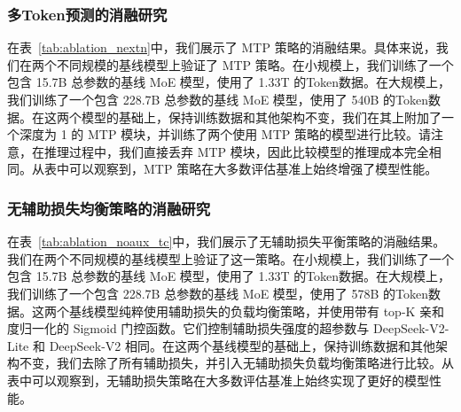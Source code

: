 \documentclass[lang=cn,a4paper,newtx]{elegantpaper}
\newcommand{\dsvii}{DeepSeek-V2}
\begin{document}
\subsubsection{多Token预测的消融研究}
\label{discussion:ablation_nextn}

在表~\ref{tab:ablation_nextn}中，我们展示了 MTP 策略的消融结果。具体来说，我们在两个不同规模的基线模型上验证了 MTP 策略。在小规模上，我们训练了一个包含 15.7B 总参数的基线 MoE 模型，使用了 1.33T 的Token数据。在大规模上，我们训练了一个包含 228.7B 总参数的基线 MoE 模型，使用了 540B 的Token数据。在这两个模型的基础上，保持训练数据和其他架构不变，我们在其上附加了一个深度为 1 的 MTP 模块，并训练了两个使用 MTP 策略的模型进行比较。请注意，在推理过程中，我们直接丢弃 MTP 模块，因此比较模型的推理成本完全相同。从表中可以观察到，MTP 策略在大多数评估基准上始终增强了模型性能。

\subsubsection{无辅助损失均衡策略的消融研究}
\label{discussion:ablation_noaux_tc}

在表~\ref{tab:ablation_noaux_tc}中，我们展示了无辅助损失平衡策略的消融结果。我们在两个不同规模的基线模型上验证了这一策略。在小规模上，我们训练了一个包含 15.7B 总参数的基线 MoE 模型，使用了 1.33T 的Token数据。在大规模上，我们训练了一个包含 228.7B 总参数的基线 MoE 模型，使用了 578B 的Token数据。这两个基线模型纯粹使用辅助损失的负载均衡策略，并使用带有 top-K 亲和度归一化的 Sigmoid 门控函数。它们控制辅助损失强度的超参数与 \dsvii{}-Lite 和 \dsvii{} 相同。在这两个基线模型的基础上，保持训练数据和其他架构不变，我们去除了所有辅助损失，并引入无辅助损失负载均衡策略进行比较。从表中可以观察到，无辅助损失策略在大多数评估基准上始终实现了更好的模型性能。
\end{document}
